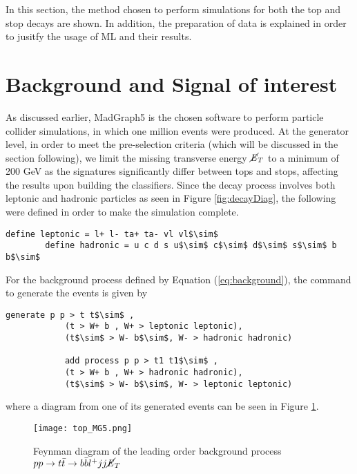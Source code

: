In this section, the method chosen to perform simulations for both the top and stop decays are shown. In addition, the preparation of data is explained in order to jusitfy the usage of ML and their results.\\
\section{Background and Signal of interest}
As discussed earlier, MadGraph5 is the chosen software to perform particle collider simulations, in which one million events were produced. At the generator level, in order to meet the pre-selection criteria (which will be discussed in the section following), we limit the missing transverse energy $\cancel{\it{E}}_{T}$ to a minimum of 200 GeV as the signatures significantly differ between tops and stops, affecting the results upon building the classifiers. Since the decay process involves both leptonic and hadronic particles as seen in Figure \ref{fig:decayDiag}, the following were defined in order to make the simulation complete. \\

\begin{lstlisting}[mathescape = true]
        define leptonic = l+ l- ta+ ta- vl vl$\sim$
        define hadronic = u c d s u$\sim$ c$\sim$ d$\sim$ s$\sim$ b b$\sim$
\end{lstlisting}

For the background process defined by Equation (\ref{eq:background}), the command to generate the events is given by
\begin{lstlisting}[mathescape = true]
            generate p p > t t$\sim$ , 
            (t > W+ b , W+ > leptonic leptonic), 
            (t$\sim$ > W- b$\sim$, W- > hadronic hadronic)
        
            add process p p > t1 t1$\sim$ ,
            (t > W+ b , W+ > hadronic hadronic), 
            (t$\sim$ > W- b$\sim$, W- > leptonic leptonic)
\end{lstlisting}
where a diagram from one of its generated events can be seen in Figure \ref{fig:bkrdFeyn}. \\

\begin{figure}[htbp]
    \centering
    \texttt{[image: top\_MG5.png]}
    \caption{Feynman diagram of the leading order background process $pp \rightarrow t \Bar{t} \rightarrow b\Bar{b}l^{+}jj\cancel{\it{E}}_{T} $}
    \label{fig:bkrdFeyn}
\end{figure}


